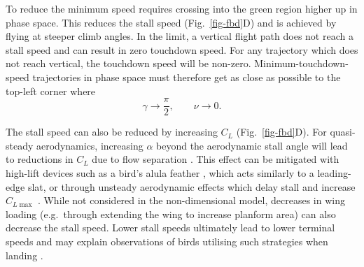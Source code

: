 To reduce the minimum speed requires crossing into the green region higher up in phase space. This reduces the stall speed (Fig.~\ref{fig-fbd}D) and is achieved by flying at steeper climb angles. In the limit, a vertical flight path does not reach a stall speed and can result in zero touchdown speed. For any trajectory which does not reach vertical, the touchdown speed will be non-zero. Minimum-touchdown-speed trajectories in phase space must therefore get as close as possible to the top-left corner where
\[
    \gamma \rightarrow \frac{\pi}{2},
    \qquad
    \nu \rightarrow 0 .
\]

The stall speed can also be reduced by increasing $C_L$ (Fig.~\ref{fig-fbd}D). For quasi-steady aerodynamics, increasing $\alpha$ beyond the aerodynamic stall angle will lead to reductions in $C_L$ due to flow separation \cite{andersonIntroductionFlight2008}. This effect can be mitigated with high-lift devices such as a bird's alula feather \cite{leeFunctionAlulaAvian2015,linehanMaintenanceAttachedLeadingedge2020}, which acts similarly to a leading-edge slat, or through unsteady aerodynamic effects which delay stall and increase $C_{L\max}$ \cite{granlundUnsteadyPitchingFlat2013,poletUnsteadyDynamicsRapid2015,kieferDynamicStallHigh2022}. While not considered in the non-dimensional model, decreases in wing loading (e.g.\ through extending the wing to increase planform area) can also decrease the stall speed. Lower stall speeds ultimately lead to lower terminal speeds and may explain observations of birds utilising such strategies when landing \cite{carruthersAutomaticAeroelasticDevices2007,leeFunctionAlulaAvian2015,poletRapidAreaChange2015}.

